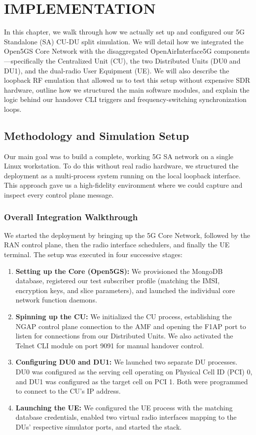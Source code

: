 \chapter{IMPLEMENTATION}

\justify
In this chapter, we walk through how we actually set up and configured our 5G Standalone (SA) CU-DU split simulation. We will detail how we integrated the Open5GS Core Network with the disaggregated OpenAirInterface5G components—specifically the Centralized Unit (CU), the two Distributed Units (DU0 and DU1), and the dual-radio User Equipment (UE). We will also describe the loopback RF emulation that allowed us to test this setup without expensive SDR hardware, outline how we structured the main software modules, and explain the logic behind our handover CLI triggers and frequency-switching synchronization loops.

\section{Methodology and Simulation Setup}
\justify
Our main goal was to build a complete, working 5G SA network on a single Linux workstation. To do this without real radio hardware, we structured the deployment as a multi-process system running on the local loopback interface. This approach gave us a high-fidelity environment where we could capture and inspect every control plane message.

\subsection{Overall Integration Walkthrough}
We started the deployment by bringing up the 5G Core Network, followed by the RAN control plane, then the radio interface schedulers, and finally the UE terminal. The setup was executed in four successive stages:
\begin{enumerate}[leftmargin=*]
    \item \textbf{Setting up the Core (Open5GS):} We provisioned the MongoDB database, registered our test subscriber profile (matching the IMSI, encryption keys, and slice parameters), and launched the individual core network function daemons.
    \item \textbf{Spinning up the CU:} We initialized the CU process, establishing the NGAP control plane connection to the AMF and opening the F1AP port to listen for connections from our Distributed Units. We also activated the Telnet CLI module on port 9091 for manual handover control.
    \item \textbf{Configuring DU0 and DU1:} We launched two separate DU processes. DU0 was configured as the serving cell operating on Physical Cell ID (PCI) 0, and DU1 was configured as the target cell on PCI 1. Both were programmed to connect to the CU's IP address.
    \item \textbf{Launching the UE:} We configured the UE process with the matching database credentials, enabled two virtual radio interfaces mapping to the DUs' respective simulator ports, and started the stack.
\end{enumerate}

